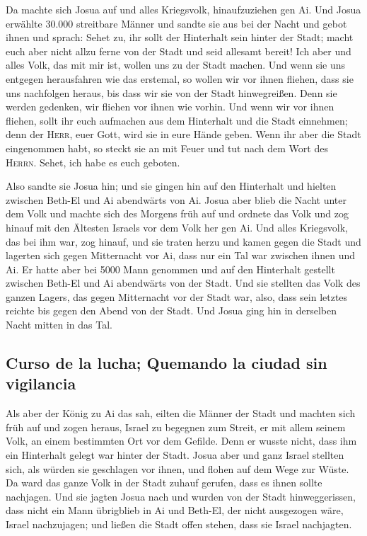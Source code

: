  Da machte sich Josua auf und alles Kriegsvolk,
hinaufzuziehen gen Ai. Und Josua erwählte 30.000 streitbare Männer und
sandte sie aus bei der Nacht  und gebot ihnen und sprach:
Sehet zu, ihr sollt der Hinterhalt sein hinter der Stadt; macht euch
aber nicht allzu ferne von der Stadt und seid allesamt bereit!
 Ich aber und alles Volk, das mit mir ist, wollen uns zu
der Stadt machen. Und wenn sie uns entgegen herausfahren wie das
erstemal, so wollen wir vor ihnen fliehen,  dass sie uns
nachfolgen heraus, bis dass wir sie von der Stadt hinwegreißen. Denn sie
werden gedenken, wir fliehen vor ihnen wie vorhin. Und wenn wir vor
ihnen fliehen,  sollt ihr euch aufmachen aus dem
Hinterhalt und die Stadt einnehmen; denn der \textsc{Herr}, euer Gott,
wird sie in eure Hände geben.  Wenn ihr aber die Stadt
eingenommen habt, so steckt sie an mit Feuer und tut nach dem Wort des
\textsc{Herrn}. Sehet, ich habe es euch geboten.

 Also sandte sie Josua hin; und sie gingen hin auf den
Hinterhalt und hielten zwischen Beth-El und Ai abendwärts von Ai. Josua
aber blieb die Nacht unter dem Volk  und machte sich des
Morgens früh auf und ordnete das Volk und zog hinauf mit den Ältesten
Israels vor dem Volk her gen Ai.  Und alles Kriegsvolk,
das bei ihm war, zog hinauf, und sie traten herzu und kamen gegen die
Stadt und lagerten sich gegen Mitternacht vor Ai, dass nur ein Tal war
zwischen ihnen und Ai.  Er hatte aber bei 5000 Mann
genommen und auf den Hinterhalt gestellt zwischen Beth-El und Ai
abendwärts von der Stadt.  Und sie stellten das Volk des
ganzen Lagers, das gegen Mitternacht vor der Stadt war, also, dass sein
letztes reichte bis gegen den Abend von der Stadt. Und Josua ging hin in
derselben Nacht mitten in das Tal.

\hypertarget{curso-de-la-lucha-quemando-la-ciudad-sin-vigilancia}{%
\subsection{Curso de la lucha; Quemando la ciudad sin
vigilancia}\label{curso-de-la-lucha-quemando-la-ciudad-sin-vigilancia}}

 Als aber der König zu Ai das sah, eilten die Männer der
Stadt und machten sich früh auf und zogen heraus, Israel zu begegnen zum
Streit, er mit allem seinem Volk, an einem bestimmten Ort vor dem
Gefilde. Denn er wusste nicht, dass ihm ein Hinterhalt gelegt war hinter
der Stadt.  Josua aber und ganz Israel stellten sich, als
würden sie geschlagen vor ihnen, und flohen auf dem Wege zur Wüste.
 Da ward das ganze Volk in der Stadt zuhauf gerufen, dass
es ihnen sollte nachjagen.  Und sie jagten Josua nach und
wurden von der Stadt hinweggerissen, dass nicht ein Mann übrigblieb in
Ai und Beth-El, der nicht ausgezogen wäre, Israel nachzujagen; und
ließen die Stadt offen stehen, dass sie Israel nachjagten.

